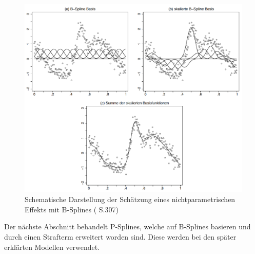 \documentclass[12pt]{scrreprt}
\begin{document}
\begin{figure}[H]
	\centering
	\includegraphics[width=\linewidth]{plots/b_spline.png}
	\caption{Schematische Darstellung der Schätzung eines nichtparametrischen Effekts mit B-Splines (\cite{fahrmeir2007regression} S.307)}
	\label{pic:b_spline}
\end{figure}

\noindent Der nächste Abschnitt behandelt P-Splines, welche auf B-Splines basieren und durch einen Strafterm erweitert worden sind. Diese werden bei den später erklärten Modellen verwendet.
\end{document}
